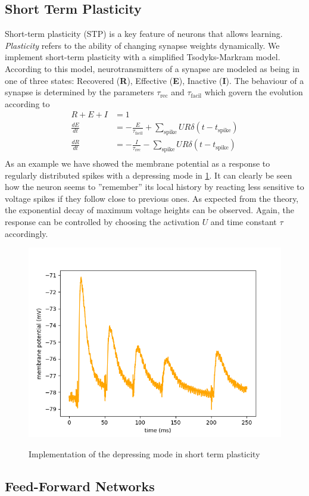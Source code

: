 \documentclass[a4paper,twocolumn]{article}
\begin{document}
\subsection{Short Term Plasticity}
Short-term plasticity (STP) is a key feature of neurons that allows learning.
\textit{Plasticity} refers to the ability of changing synapse weights dynamically.
We implement short-term plasticity with a simplified Tsodyks-Markram model.  According
to this model,  neurotransmitters of a synapse are modeled as being in one of
three states: Recovered (\textbf{R}),  Effective (\textbf{E}),  Inactive
(\textbf{I}).  The behaviour of a synapse is determined by the parameters
$\tau_\text{rec}$ and $\tau_\text{facil}$ which govern the evolution according to
\begin{align*}
	R + E + I &= 1 \\
	\frac{dE}{dt} &= - \frac{E}{\tau_\text{facil}} + \sum_\text{spike} UR\delta(t-t_\text{spike} ) \\
	\frac{dR}{dt} &= - \frac{I}{\tau_\text{rec}} - \sum_\text{spike} UR\delta(t-t_\text{spike} ) \\
\end{align*}
As an example we have showed the membrane potential as a response to regularly
distributed spikes with a depressing mode in \ref{stp_depress}.  It can clearly be
seen how the neuron seems to ''remember'' its local history by reacting less sensitive
to voltage spikes if they follow close to previous ones.  As expected from the theory,
the exponential decay of maximum voltage heights can be observed.  Again,  the response
can be controlled by choosing the activation $U$ and time constant $\tau$ accordingly.
\begin{figure}
		\includegraphics[width=.5\textwidth]{figures/stp_depressing.png}
		\label{stp_depress}
		\caption{Implementation of the depressing mode in short term plasticity}
\end{figure}

\subsection{Feed-Forward Networks}
\label{sec:feed-forward}
\end{document}
